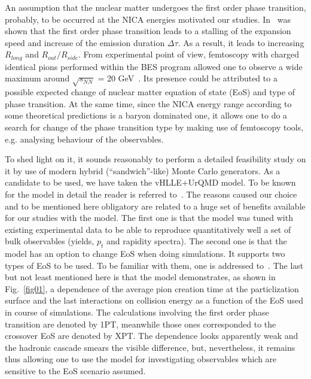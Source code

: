 \documentclass[a4paper]{panl}
\begin{document}
An assumption that the nuclear matter undergoes the first order phase transition, probably, to be occurred at the NICA energies motivated our studies.
In~\cite{Rischke:1996em} was shown that the first order phase transition leads to a stalling of the expansion speed and increase of the emission duration $\Delta \tau$.
As a result, it leads to increasing $R_{long}$ and $R_{out} / R_{side}$.
From experimental point of view, femtoscopy with charged identical pions performed within the BES program allowed one to observe a wide maximum around
$\sqrt{s_{NN}}$ = 20 GeV~\cite{Adamczyk:2014mxp}. Its presence could be attributed to a possible expected change of nuclear matter equation of state (EoS) and type of phase transition.
At the same time, since the NICA energy range according to some theoretical predictions is a baryon dominated one, it allows one to do a search for change of the phase transition type
by making use of femtoscopy tools, e.g. analysing behaviour of the observables.

To shed light on it, it sounds reasonably to perform a detailed feasibility study on it by use of modern
hybrid (``sandwich''-like) Monte Carlo generators. As a candidate to be used, we have taken the vHLLE+UrQMD model.
 To be known for the model in detail the reader is referred to~\cite{Karpenko:2015xea}. The reasons caused our choice and to be mentioned here obligatory are related to a huge set of benefits available for our studies with the model. The first one is that the model was tuned with existing experimental data to be able to reproduce quantitatively well a set of bulk observables
(yields, $p_{t}$ and rapidity spectra). The second one is that the model has an option to change EoS when doing simulations. It supports two types of EoS to be used.
To be familiar with them, one is addressed to~\cite{Steinheimer:2010ib, Kolb:2000sd}. The last but not least mentioned here is that the model demonstrates, as shown
in Fig.~\ref{fig01}, a dependence of the average pion creation time at the particlization surface and the last interactions on collision energy as a function of the EoS used
in course of simulations. The calculations involving the first order phase transition are denoted by 1PT, meanwhile those ones corresponded to the crossover EoS are denoted by XPT.
The dependence looks apparently weak and the hadronic cascade smears the visible difference, but, nevertheless, it remains thus allowing one to use the model for investigating
observables which are sensitive to the EoS scenario assumed. 
\end{document}
